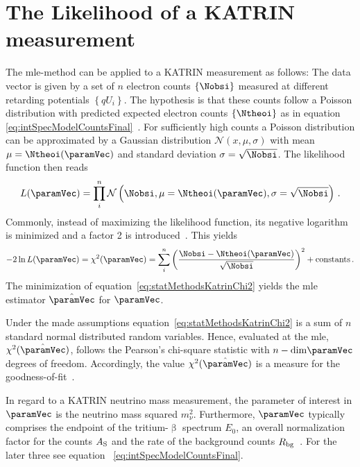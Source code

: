 \section{The Likelihood of a KATRIN measurement}
\label{sec:statMethodsKATRINLikelihood}
The \gls{mle}-method can be applied to a KATRIN measurement as follows: The data vector is given by a set of $n$ electron counts $\left\{\Nobsi\right\}$ measured at different retarding potentials $\left\{qU_i\right\}$. The hypothesis is that these counts follow a Poisson distribution with predicted expected electron counts $\left\{\Ntheoi\right\}$ as in equation \eqref{eq:intSpecModelCountsFinal}~\cite{Kleesiek2014}. For sufficiently high counts a Poisson distribution can be approximated by a Gaussian distribution $\mathcal{N}(x,\mu, \sigma)$ with mean $\mu=\Ntheoi(\paramVec)$ and standard deviation $\sigma=\sqrt{\Nobsi}$.  The likelihood function then reads
\begin{equation}
	\label{eq:KATRINlikelihood}
	L(\paramVec) = \prod_{i}^{n} \mathcal{N}\left(\Nobsi,\mu=\Ntheoi(\paramVec), \sigma=\sqrt{\Nobsi}\right)
	\fullstop
\end{equation}
Commonly, instead of maximizing the likelihood function, its negative logarithm is minimized and a factor 2 is introduced~\cite{ReviewOfParticlePhysics}. This yields
\begin{equation}
	\label{eq:statMethodsKatrinChi2}
	-2\ln L(\paramVec) = \chi^2(\paramVec) = \sum_i^n
		\left( 
			\frac{\Nobsi-\Ntheoi(\paramVec)}{\sqrt{\Nobsi}}
		\right)^2
		 + \mathrm{constants}
		\fullstop
\end{equation}
The minimization of equation~\eqref{eq:statMethodsKatrinChi2} yields the \gls{mle} estimator $\hat{\paramVec}$ for $\paramVec$.

Under the made assumptions equation~\eqref{eq:statMethodsKatrinChi2} is a sum of $n$ standard normal distributed random variables. Hence, evaluated at the \gls{mle},  $\chi^2(\hat{\paramVec})$, follows the Pearson's chi-square statistic with $n-\mathrm{dim}\paramVec$ degrees of freedom. Accordingly, the value $\chi^2(\hat{\paramVec})$ is a measure for the goodness-of-fit~\cite{ReviewOfParticlePhysics}.

In regard to a KATRIN neutrino mass measurement, the parameter of interest in $\paramVec$ is the neutrino mass squared $m_\nu^2$. Furthermore, $\paramVec$ typically comprises the endpoint of the tritium-$\upbeta$ spectrum $E_0$, an overall normalization factor for the counts $A_\mathrm{S}$ and the rate of the background counts $R_\mathrm{bg}$~\cite{Kleesiek2014}. For the later three see equation ~\eqref{eq:intSpecModelCountsFinal}.

